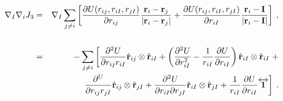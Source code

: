 \begin{eqnarray}
\nabla_I \nabla_i J_3 & = & \nabla_I \sum_{j \neq i}
\left[\frac{\partial U(r_{ij}, r_{iI},r_{jI})}{\partial r_{ij}}
  \frac{\mathbf{r}_i - \mathbf{r}_j}{|\mathbf{r}_i - \mathbf{r}_j|} 
+ \frac{\partial U(r_{ij}, r_{iI},r_{jI})}{\partial r_{iI}}
  \frac{\mathbf{r}_i - \mathbf{I}}{|\mathbf{r}_i - \mathbf{I}|}  \right]\:, \\\nonumber \\\nonumber
& = & -\sum_{j\neq i} \left[ 
\frac{\partial^2 U}{\partial r_{ij} r_{iI}} \hat{\mathbf{r}}_{ij} \otimes
\hat{\mathbf{r}}_{iI} + \left(\frac{\partial^2 U}{\partial r_{iI}^2} -
\frac{1}{r_{iI}} \frac{\partial U}{\partial r_{iI}}\right)
\hat{\mathbf{r}}_{iI} \otimes \hat{\mathbf{r}}_{iI} \right. + \\\nonumber
& & \left. \qquad \ \ \  \frac{\partial^U}{\partial r_{ij} r_{jI}} \hat{\mathbf{r}}_{ij} \otimes \hat{\mathbf{r}}_{jI} + \frac{\partial^2 U}{\partial r_{iI} \partial r_{jI}}
\hat{\mathbf{r}}_{iI}\otimes \hat{\mathbf{r}}_{jI}  +
\frac{1}{r_{iI}} \frac{\partial U}{\partial r_{iI}} \overleftrightarrow{\mathbf{1}}\right]\:.
\end{eqnarray}

